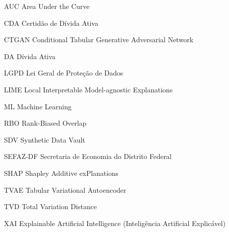 \begin{siglas}
  \item[AUC] Area Under the Curve
  \item[CDA] Certidão de Dívida Ativa
  \item[CTGAN] Conditional Tabular Generative Adversarial Network
  \item[DA] Dívida Ativa
  \item[LGPD] Lei Geral de Proteção de Dados
  \item[LIME] Local Interpretable Model-agnostic Explanations
  \item[ML] Machine Learning
  \item[RBO] Rank-Biased Overlap
  \item[SDV] Synthetic Data Vault
  \item[SEFAZ-DF] Secretaria de Economia do Distrito Federal
  \item[SHAP] Shapley Additive exPlanations
  \item[TVAE] Tabular Variational Autoencoder
  \item[TVD] Total Variation Distance
  \item[XAI] Explainable Artificial Intelligence (Inteligência Artificial Explicável)
\end{siglas}

